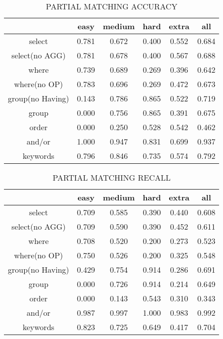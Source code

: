 \begin{table}[h!]
    \centering
    \begin{tabular}{|c|c|c|c|c|c|}
        \hline
                         & easy  & medium & hard  & extra & all   \\ \hline
        select           & 0.781 & 0.672  & 0.400 & 0.552 & 0.684 \\ \hline
        select(no AGG)   & 0.781 & 0.678  & 0.400 & 0.567 & 0.688 \\ \hline
        where            & 0.739 & 0.689  & 0.269 & 0.396 & 0.642 \\ \hline
        where(no OP)     & 0.783 & 0.696  & 0.269 & 0.472 & 0.673 \\ \hline
        group(no Having) & 0.143 & 0.786  & 0.865 & 0.522 & 0.719 \\ \hline
        group            & 0.000 & 0.756  & 0.865 & 0.391 & 0.675 \\ \hline
        order            & 0.000 & 0.250  & 0.528 & 0.542 & 0.462 \\ \hline
        and/or           & 1.000 & 0.947  & 0.831 & 0.699 & 0.937 \\ \hline

        keywords         & 0.796 & 0.846  & 0.735 & 0.574 & 0.792 \\ \hline
    \end{tabular}
    \caption{PARTIAL MATCHING ACCURACY}

\end{table}

\begin{table}[h!]
    \centering
    \begin{tabular}{|c|c|c|c|c|c|}
        \hline
                         & easy  & medium & hard  & extra & all   \\ \hline
        select           & 0.709 & 0.585  & 0.390 & 0.440 & 0.608 \\ \hline
        select(no AGG)   & 0.709 & 0.590  & 0.390 & 0.452 & 0.611 \\ \hline
        where            & 0.708 & 0.520  & 0.200 & 0.273 & 0.523 \\ \hline
        where(no OP)     & 0.750 & 0.526  & 0.200 & 0.325 & 0.548 \\ \hline
        group(no Having) & 0.429 & 0.754  & 0.914 & 0.286 & 0.691 \\ \hline
        group            & 0.000 & 0.726  & 0.914 & 0.214 & 0.649 \\ \hline
        order            & 0.000 & 0.143  & 0.543 & 0.310 & 0.343 \\ \hline
        and/or           & 0.987 & 0.997  & 1.000 & 0.983 & 0.992 \\ \hline

        keywords         & 0.823 & 0.725  & 0.649 & 0.417 & 0.704 \\ \hline
    \end{tabular}
    \caption{PARTIAL MATCHING RECALL }

\end{table}

